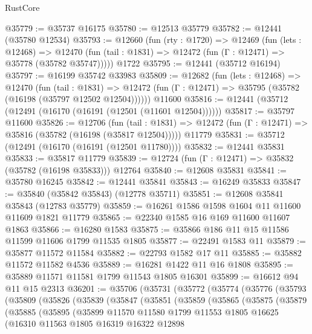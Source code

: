 \begin{lexlean}{RustCore}
\begin{coremodule}
@35779 := @35737 @16175
@35780 := @12513 @35779
@35782 := @12441 (@35780 @12534)
@35793 := @12660
    (fun (rty : @1720) =>
    @12469
      (fun (lets : @12468) =>
      @12470 (fun (tail : @1831) => @12472 (fun (Γ : @12471) => @35778 (@35782 @35747)))))
    @1722
@35795 := @12441 (@35712 @16194)
@35797 := @16199 @35742 @33983
@35809 := @12682
    (fun (lets : @12468) =>
    @12470
      (fun (tail : @1831) =>
      @12472 (fun (Γ : @12471) => @35795 (@35782 (@16198 (@35797 @12502 @12504))))))
    @11600
@35816 := @12441 (@35712 (@12491 (@16170 (@16191 (@12501 (@11601 @12504))))))
@35817 := @35797 @11600
@35826 := @12706
    (fun (tail : @1831) => @12472 (fun (Γ : @12471) => @35816 (@35782 (@16198 (@35817 @12504)))))
    @11779
@35831 := @35712 (@12491 (@16170 (@16191 (@12501 @11780))))
@35832 := @12441 @35831
@35833 := @35817 @11779
@35839 := @12724 (fun (Γ : @12471) => @35832 (@35782 (@16198 @35833))) @12764
@35840 := @12608 @35831
@35841 := @35780 @16245
@35842 := @12441 @35841
@35843 := @16249 @35833
@35847 := @35840 (@35842 @35843) (@12778 @35711)
@35851 := @12608 @35841 @35843 (@12783 @35779)
@35859 := @16261 @1586 @1598 @1604 @11 @11600 @11609 @1821 @11779
@35865 := @22340 @1585 @16 @169 @11600 @11607 @1863
@35866 := @16280 @1583
@35875 := @35866 @186 @11 @15 @11586 @11599 @11606 @1799 @11535 @1805
@35877 := @22491 @1583 @11
@35879 := @35877 @11572 @11584
@35882 := @22793 @1582 @17 @11
@35885 := @35882 @11572 @11582 @4536
@35889 := @16281 @1422 @11 @16 @1808
@35895 := @35889 @11571 @11581 @1799 @11543 @1805 @16301
@35899 := @16612 @94 @11 @15 @2313
@36201 := @35706
    (@35731
      (@35772
        (@35774
          (@35776
            (@35793
              (@35809
                (@35826
                  (@35839
                    (@35847
                      (@35851
                        (@35859
                          (@35865
                            (@35875
                              (@35879
                                (@35885
                                  (@35895
                                    (@35899
                                      @11570
                                      @11580
                                      @1799
                                      @11553
                                      @1805
                                      @16625
                                      (@16310
                                        @11563
                                        @1805
                                        @16319
                                        @16322
                                        @12898

\end{coremodule}
\end{lexlean}
